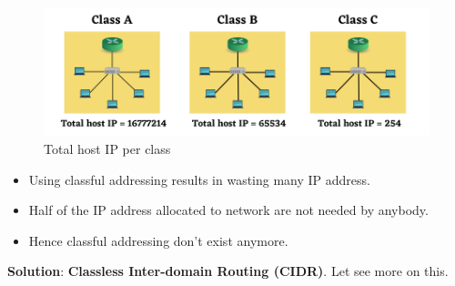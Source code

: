 \setlength{\columnsep}{3pt}
\begin{flushleft}
\bigskip

\begin{figure}[h!]
	\centering
	\includegraphics[scale=.6]{content/chapter14/images/class_abc.png}
	\caption{Total host IP per class}
	\label{fig:type}
\end{figure}	

\begin{itemize}
	\item Using classful addressing results in wasting many IP address.
	\item Half of the IP address allocated to network are not needed by anybody.
	\item Hence classful addressing don't exist anymore.
\end{itemize}

\textbf{Solution}: \textbf{Classless Inter-domain Routing (CIDR)}. Let see more on this.

\end{flushleft}
\newpage


